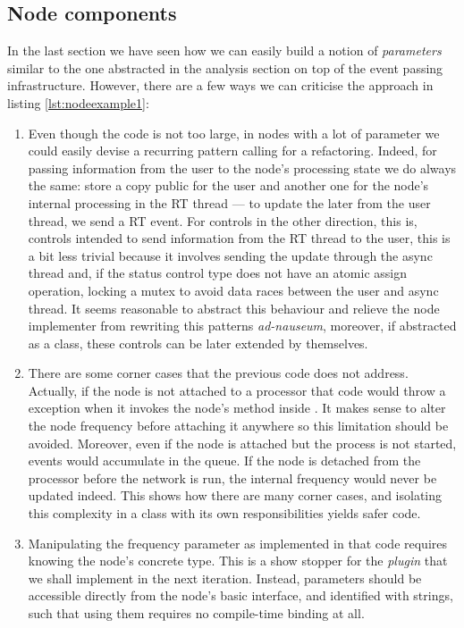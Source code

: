 \subsection{Node components}

In the last section we have seen how we can easily build a notion of
\emph{parameters} similar to the one abstracted in the analysis
section on top of the event passing infrastructure. However, there are
a few ways we can criticise the approach in listing
\ref{lst:nodeexample1}:
\begin{enumerate}
\item Even though the code is not too large, in nodes with a lot of
  parameter we could easily devise a recurring pattern calling for a
  refactoring. Indeed, for passing information from the user to the
  node's processing state we do always the same: store a copy public
  for the user and another one for the node's internal processing in
  the RT thread --- to update the later from the user thread, we send
  a RT event. For controls in the other direction, this is, controls
  intended to send information from the RT thread to the user, this is
  a bit less trivial because it involves sending the update through
  the async thread and, if the status control type does not have an
  atomic assign operation, locking a mutex to avoid data races between
  the user and async thread. It seems reasonable to abstract this
  behaviour and relieve the node implementer from rewriting this
  patterns \emph{ad-nauseum}, moreover, if abstracted as a class,
  these controls can be later extended by themselves.

\item There are some corner cases that the previous code does not
  address. Actually, if the node is not attached to a processor that
  code would throw a  exception when it
  invokes the node's  method inside
  . It makes sense to alter the node frequency
  before attaching it anywhere so this limitation should be
  avoided. Moreover, even if the node is attached but the process is
  not started, events would accumulate in the queue. If the node is
  detached from the processor before the network is run, the internal
  frequency would never be updated indeed. This shows how there are
  many corner cases, and isolating this complexity in a class with its
  own responsibilities yields safer code.

\item Manipulating the frequency parameter as implemented in that code
  requires knowing the node's concrete type. This is a show stopper
  for the \emph{plugin} that we shall implement in the next
  iteration. Instead, parameters should be accessible directly from
  the node's basic interface, and identified with strings, such that
  using them requires no compile-time binding at all.
\end{enumerate}

